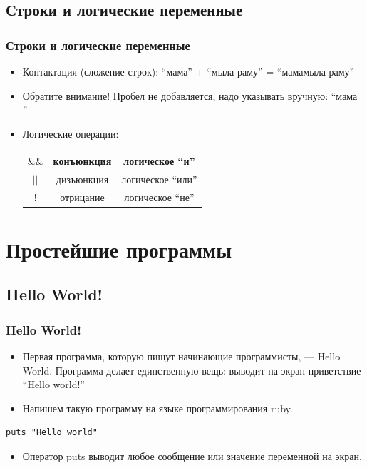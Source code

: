 \documentclass[compress,red]{beamer}
\begin{document}
\subsection{Строки и логические переменные}
\begin{frame}
  \frametitle{Строки и логические переменные}
  \begin{itemize}
    \item Контактация (сложение строк): ``мама'' + ``мыла раму'' = ``мамамыла раму''
    \item Обратите внимание! Пробел не добавляется, надо указывать вручную: ``мама ''
    \item Логические операции:
    \newline
    	\begin{tabular}{|c|c|c|}
    	\hline
    	$\&\&$ & конъюнкция & логическое ``и'' \\
    	\hline
    	$||$ & дизъюнкция & логическое ``или'' \\
    	\hline
    	$!$ & отрицание & логическое ``не'' \\
    	\hline
    	\end{tabular}
	\end{itemize}
\end{frame}

\section{Простейшие программы}
\subsection{Hello World!}
\begin{frame}[fragile]
  \frametitle{Hello World!}
  \begin{itemize}
    \item Первая программа, которую пишут начинающие программисты, --- Hello World. Программа делает единственную вещь: выводит на экран приветствие ``Hello world!''
    \item Напишем такую программу на языке программирования ruby.
  \end{itemize}
  \begin{lstlisting}[label=ruby1,caption=Hello World]
    puts "Hello world"
  \end{lstlisting}
  \begin{itemize}
    \item Оператор puts выводит любое сообщение или значение переменной на экран.
  \end{itemize}
\end{frame}
\end{document}
